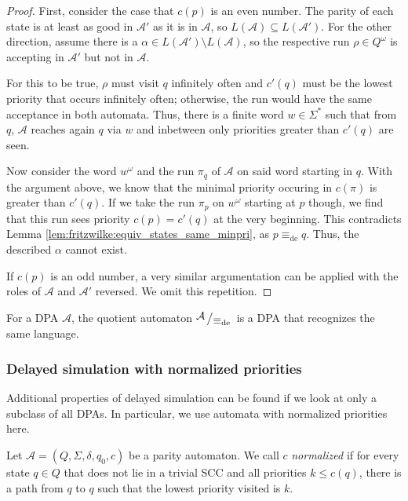 \begin{proof}
	First, consider the case that $c(p)$ is an even number. The parity of each state is at least as good in $\mathcal{A}'$ as it is in $\mathcal{A}$, so $L(\mathcal{A}) \subseteq L(\mathcal{A}')$. For the other direction, assume there is a $\alpha \in L(\mathcal{A}') \setminus L(\mathcal{A})$, so the respective run $\rho \in Q^\omega$ is accepting in $\mathcal{A}'$ but not in $\mathcal{A}$. 
	
	For this to be true, $\rho$ must visit $q$ infinitely often and $c'(q)$ must be the lowest priority that occurs infinitely often; otherwise, the run would have the same acceptance in both automata. Thus, there is a finite word $w \in \Sigma^*$ such that from $q$, $\mathcal{A}$ reaches again $q$ via $w$ and inbetween only priorities greater than $c'(q)$ are seen.
	
	Now consider the word $w^\omega$ and the run $\pi_q$ of $\mathcal{A}$ on said word starting in $q$. With the argument above, we know that the minimal priority occuring in $c(\pi)$ is greater than $c'(q)$. If we take the run $\pi_p$ on $w^\omega$ starting at $p$ though, we find that this run sees priority $c(p) = c'(q)$ at the very beginning. This contradicts Lemma \ref{lem:fritzwilke:equiv_states_same_minpri}, as $p \equiv_\text{de} q$. Thus, the described $\alpha$ cannot exist. 
	
	If $c(p)$ is an odd number, a very similar argumentation can be applied with the roles of $\mathcal{A}$ and $\mathcal{A}'$ reversed. We omit this repetition.
\end{proof}

\begin{cor}
	For a DPA $\mathcal{A}$, the quotient automaton $\bigslant{\mathcal{A}}{\equiv_\text{de}}$ is a DPA that recognizes the same language.
\end{cor}





\subsubsection{Delayed simulation with normalized priorities}
Additional properties of delayed simulation can be found if we look at only a subclass of all DPAs. In particular, we use automata with normalized priorities here. 

\begin{defn}
	Let $\mathcal{A} = (Q, \Sigma, \delta, q_0, c)$ be a parity automaton. We call $c$ \emph{normalized} if for every state $q \in Q$ that does not lie in a trivial SCC and all priorities $k \leq c(q)$, there is a path from $q$ to $q$ such that the lowest priority visited is $k$.
\end{defn}

